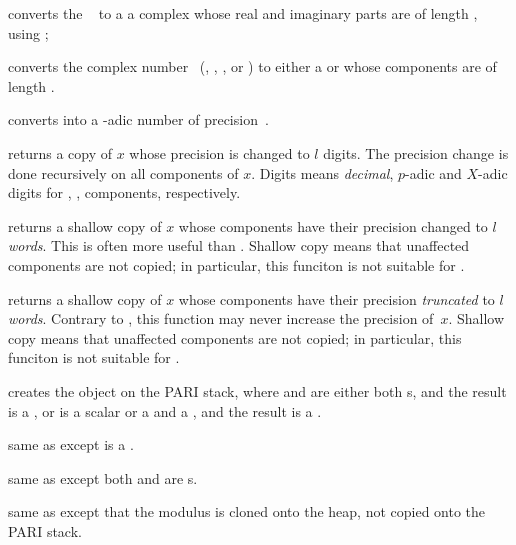 converts the ~ to a
a complex whose real and imaginary parts are  of length ,
using ;

 converts the complex number~
(, , ,  or ) to either
a  or  whose components are  of length
.

 converts  into a 
-adic number of precision~.

 returns a copy of $x$ whose precision is
changed to $l$ digits. The precision change is done recursively on all
components of $x$. Digits means \emph{decimal}, $p$-adic and $X$-adic digits
for , ,  components, respectively.

 returns a shallow copy of $x$ whose
 components have their precision changed to $l$ \emph{words}. This
is often more useful than . Shallow copy means that unaffected
components are not copied; in particular, this funciton is not suitable for
.

 returns a shallow copy of $x$ whose
 components have their precision \emph{truncated} to $l$
\emph{words}. Contrary to , this function may never increase
the precision of~$x$. Shallow copy means that unaffected components are not
copied; in particular, this funciton is not suitable for .


 creates the object  on
the PARI stack, where  and  are either both s, and the
result is a , or  is a scalar or a  and  a
, and the result is a .

 same as  except  is a
.

 same as  except both
 and  are s.

 same as  except that the
modulus  is cloned onto the heap, not copied onto the PARI stack.


